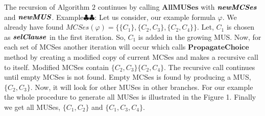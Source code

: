 The recursion of Algorithm $2$ continues by calling $\textbf{AllMUSes}$ with $\textbf{\textit{newMCSes}}$ and $\textbf{\textit{newMUS}}$.
Example$\clubsuit\clubsuit$:\newline
Let us consider, our example formula $\varphi$. We already have found $MCSes(\varphi)=\{\{C_{1}\}, \{C_{2}, C_{3}\}, \{C_{2}, C_{4}\}\}$. Let, $C_{1}$ is chosen as $\textbf{\textit{selClause}}$ in the first iteration. So, $C_{1}$ is added in the growing MUS. Now, for each set of MCSes another iteration will occur which calls $\textbf{PropagateChoice}$ method by creating a modified copy of current MCSes and makes a recursive call to itself. Modified MCSes contain $\{C_{2}, C_{3}\}\{C_{2},C_{4}\}$. The recursive call continues until empty MCSes is not found. Empty MCSes is found by producing a MUS, $\{C_{2}, C_{3}\}$. Now, it will look for other MUSes in other branches. For our example the whole procedure to generate all MUSes is illustrated in the Figure 1. Finally we get all MUSes, $\{C_{1}, C_{2}\}$ and $\{C_{1},C_{3}, C_{4}\}$.
